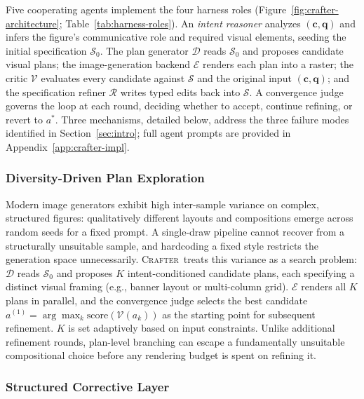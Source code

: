 \documentclass{article}
\newcommand{\Crafter}{\textsc{Crafter}\xspace}
\begin{document}
Five cooperating agents implement the four harness roles (Figure~\ref{fig:crafter-architecture}; Table~\ref{tab:harness-roles}). An \emph{intent reasoner} analyzes $(\mathbf{c}, \mathbf{q})$ and infers the figure's communicative role and required visual elements, seeding the initial specification $\mathcal{S}_0$. The plan generator $\mathcal{D}$ reads $\mathcal{S}_0$ and proposes candidate visual plans; the image-generation backend $\mathcal{E}$ renders each plan into a raster; the critic $\mathcal{V}$ evaluates every candidate against $\mathcal{S}$ and the original input $(\mathbf{c}, \mathbf{q})$; and the specification refiner $\mathcal{R}$ writes typed edits back into $\mathcal{S}$. A convergence judge governs the loop at each round, deciding whether to accept, continue refining, or revert to $a^*$. Three mechanisms, detailed below, address the three failure modes identified in Section~\ref{sec:intro}; full agent prompts are provided in Appendix~\ref{app:crafter-impl}.

\subsubsection{Diversity-Driven Plan Exploration}
\label{sec:method-diversity}

Modern image generators exhibit high inter-sample variance on complex, structured figures: qualitatively different layouts and compositions emerge across random seeds for a fixed prompt. A single-draw pipeline cannot recover from a structurally unsuitable sample, and hardcoding a fixed style restricts the generation space unnecessarily. \Crafter\ treats this variance as a search problem: $\mathcal{D}$ reads $\mathcal{S}_0$ and proposes $K$ intent-conditioned candidate plans, each specifying a distinct visual framing (e.g., banner layout or multi-column grid). $\mathcal{E}$ renders all $K$ plans in parallel, and the convergence judge selects the best candidate $a^{(1)} \!=\! \arg\max_{k} \mathrm{score}(\mathcal{V}(a_k))$ as the starting point for subsequent refinement. $K$ is set adaptively based on input constraints. Unlike additional refinement rounds, plan-level branching can escape a fundamentally unsuitable compositional choice before any rendering budget is spent on refining it.

\subsubsection{Structured Corrective Layer}
\label{sec:method-corrective}
\end{document}
